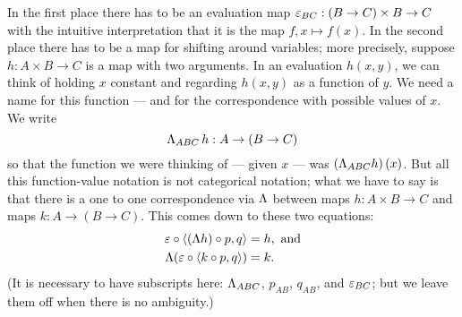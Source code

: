 In the first place there has to be an evaluation map $\varepsilon_{BC} : (B \rightarrow C) \times B \rightarrow C$
with the intuitive interpretation that it is the map $ f,x \mapsto f(x)$. In the second
place there has to be a map for shifting around variables; more precisely, suppose $h:
A\times B \to C$ is a map with two arguments. In an evaluation $h(x,y)$, we can think of
holding $x$ constant and regarding $h(x,y)$ as a function of $y$. We need a name for this
function --- and for the correspondence with possible values of $x$. We write
$$
\Lambda_{ABC}\, h : A\rightarrow (B \rightarrow C)
$$
%
so that the function we were thinking of --- given $x$ --- was $(\Lambda_{ABC} h)\, (x)$. But
all this function-value notation is not categorical notation; what we have to say is that
there is a one to one correspondence via $\Lambda$ between maps $h : A\times B \to C$ and maps $k:
A \to (B \to C)$. This comes down to these two equations:
%
\begin{align*}
\varepsilon \circ \langle (\Lambda h)\circ p, q\rangle &= h, {\textrm{ and}} \\
\Lambda(\varepsilon \circ \langle k \circ p, q \rangle) &= k.
\end{align*}
%
(It is necessary to have subscripts here: $\Lambda_{ABC}$, $p_{AB}$, $q_{AB}$, and $\varepsilon_{BC}$; but
we leave them off when there is no ambiguity.)

